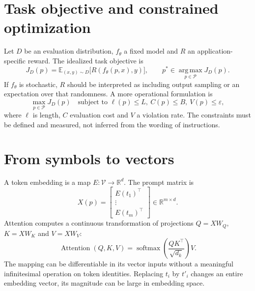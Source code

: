 \documentclass[12pt,a4paper,oneside]{report}
\newcommand{\Vocab}{\mathcal V}
\newcommand{\Pspace}{\mathcal P}
\newcommand{\R}{\mathbb R}
\newcommand{\E}{\mathbb E}
\begin{document}
\section{Task objective and constrained optimization}
Let $D$ be an evaluation distribution, $f_{\theta}$ a fixed model and $R$ an application-specific reward. The idealized task objective is
\begin{equation}
J_D(p)=\E_{(x,y)\sim D}\bigl[R(f_{\theta}(p,x),y)\bigr],
\qquad p^*\in\operatorname*{arg\,max}_{p\in\Pspace}J_D(p).
\label{eq:objective}
\end{equation}
If $f_\theta$ is stochastic, $R$ should be interpreted as including output sampling or an expectation over that randomness. A more operational formulation is
\begin{equation}\max_{p\in\Pspace}J_D(p)\quad\text{subject to }\ell(p)\le L,\ C(p)\le B,\ V(p)\le\varepsilon,\end{equation}
where $\ell$ is length, $C$ evaluation cost and $V$ a violation rate. The constraints must be defined and measured, not inferred from the wording of instructions.

\section{From symbols to vectors}
A token embedding is a map $E:\Vocab\to\R^d$. The prompt matrix is
\begin{equation}X(p)=\begin{bmatrix}E(t_1)^\top\\\vdots\\E(t_m)^\top\end{bmatrix}\in\R^{m\times d}.\end{equation}
Attention computes a continuous transformation of projections $Q=XW_Q$, $K=XW_K$ and $V=XW_V$:
\begin{equation}\operatorname{Attention}(Q,K,V)=\operatorname{softmax}\left(\frac{QK^\top}{\sqrt{d_k}}\right)V.\label{eq:attn}\end{equation}
The mapping can be differentiable in its vector inputs without a meaningful infinitesimal operation on token identities. Replacing $t_i$ by $t'_i$ changes an entire embedding vector, its magnitude can be large in embedding space.
\end{document}
